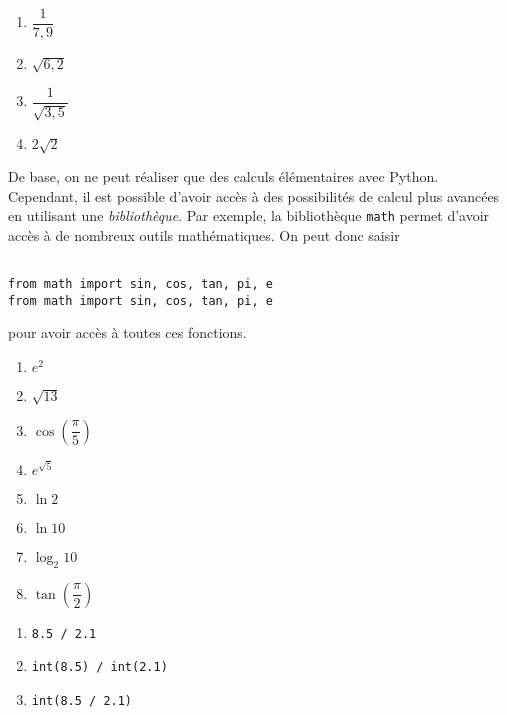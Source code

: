 \begin{multicols}{2}
  \begin{enumerate}[label=\emph{\alph*)}]
    \item $\dfrac{1}{7,9}$
    \item $\sqrt{6,2}$
    \item $\dfrac{1}{\sqrt{3,5}}$
    \item $2\sqrt{2}$
  \end{enumerate}
\end{multicols}
De base, on ne peut réaliser que des calculs élémentaires avec Python. Cependant, il est possible d'avoir accès à des possibilités de calcul plus avancées en utilisant une \emph{bibliothèque}. 
Par exemple, la bibliothèque \texttt{math} permet d'avoir accès à de nombreux outils mathématiques. 
On peut donc saisir
\begin{lstlisting}

from math import sin, cos, tan, pi, e
from math import sin, cos, tan, pi, e 
\end{lstlisting}

pour avoir accès à toutes ces fonctions. \\

\begin{multicols}{2}
  \begin{enumerate}[label=\emph{\alph*)}]
    \item $e^2$
    \item $\sqrt{13}$
    \item $\cos\left(\dfrac{\pi}{5}\right)$
    \item $e^{\sqrt{5}}$
    \item $\ln 2$
    \item $\ln 10$
    \item $\log_{2} 10$
    \item $\tan\left(\dfrac{\pi}{2}\right)$
  \end{enumerate}
\end{multicols}


\begin{multicols}{2}
  \begin{enumerate}[label=\emph{\alph*)}]
    \item \texttt{8.5 / 2.1}
    \item \texttt{int(8.5) / int(2.1)}
    \item \texttt{int(8.5 / 2.1)}
  \end{enumerate}
\end{multicols}

